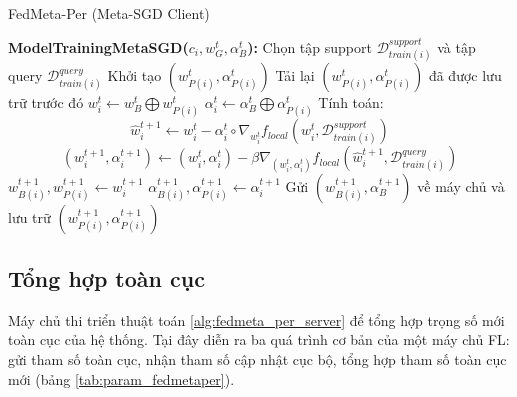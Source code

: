 \begin{algorithm}[H]
    \caption{FedMeta-Per (Meta-SGD Client)} \label{alg:fedsgd_per_client}
    \begin{algorithmic}[1]
        \State\textbf{ModelTrainingMetaSGD($c_i, w_G^t, \alpha_B^t$):}
        \State Chọn tập support $\mathcal{D}_{train(i)}^{support}$ và tập query $\mathcal{D}_{train(i)}^{query}$
            \State Khởi tạo $(w_{P(i)}^t, \alpha_{P(i)}^t)$
        \Else
            \State Tải lại $(w_{P(i)}^t, \alpha_{P(i)}^t)$ đã được lưu trữ trước đó
        \EndIf
        \State $w_i^t \gets w_B^t \bigoplus w_{P(i)}^t$ 
        \State $\alpha_i^t \gets \alpha_B^t \bigoplus \alpha_{P(i)}^t$ 
        \State Tính toán:
        \begin{dmath*}
            \hat{w}_{i}^{t+1} \gets w_{i}^t - \alpha_i^t\circ\nabla_{w_i^t} f_{local}(w_{i}^t, \mathcal{D}_{train(i)}^{support})
        \end{dmath*}
        \begin{dmath*}
            (w_{i}^{t+1}, \alpha_i^{t+1}) \gets (w_{i}^t, \alpha_{i}^{t}) - \beta\nabla_{(w_i^t, \alpha_i^t)} f_{local}(\hat{w}_{i}^{t+1}, \mathcal{D}_{train(i)}^{query})
        \end{dmath*}
        \State $w_{B(i)}^{t+1}, w_{P(i)}^{t+1} \gets w_i^{t+1}$ 
        \State $\alpha_{B(i)}^{t+1}, \alpha_{P(i)}^{t+1} \gets \alpha_i^{t+1}$ 
        \State Gửi $(w_{B(i)}^{t+1}, \alpha_B^{t+1})$ về máy chủ và lưu trữ $(w_{P(i)}^{t+1}, \alpha_{P(i)}^{t+1})$
    \end{algorithmic}
\end{algorithm}

\subsection{Tổng hợp toàn cục}

Máy chủ thi triển thuật toán \ref{alg:fedmeta_per_server} để tổng hợp trọng số mới toàn cục của hệ thống. Tại đây diễn ra ba quá trình cơ bản của một máy chủ FL: gửi tham số toàn cục, nhận tham số cập nhật cục bộ, tổng hợp tham số toàn cục mới (bảng \ref{tab:param_fedmetaper}).

